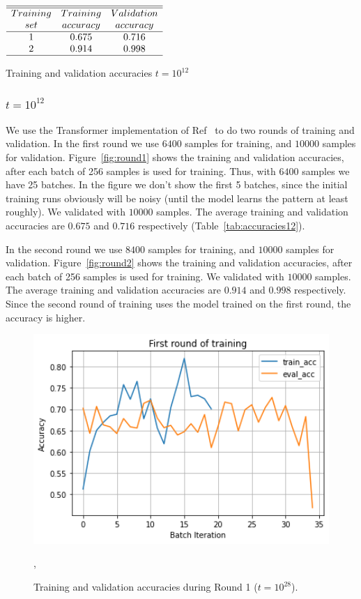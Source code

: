 \documentclass[twoside]{article}
\begin{document}
\begin{table}
\centering \(\begin{array}{ccc}
\hline
\hline
Training  & Training &Validation  \\
set     &accuracy&accuracy\\
\hline
1  & 0.675 & 0.716 \\

2  & 0.914 & 0.998 \\
\hline
\end{array}\)
\caption{Training and validation accuracies $t=10^{12}$}
\label{tab:accuracies12}
\end{table}

\subsubsection{\label{10E12} $t=10^{12}$}
We use the Transformer implementation of Ref~\cite{shankergit} to do two rounds of training and validation. In the first round we use $6400$ samples for training, and $10000$ samples for validation. Figure~\ref{fig:round1} shows the training and validation accuracies, after each batch of 256 samples is used for training. Thus, with $6400$ samples we have 25 batches. In the figure we don't show the first 5 batches, since the initial training runs obviously will be noisy (until the model learns the pattern at least roughly). We validated with $10000$ samples. The average training and validation accuracies are $0.675$ and $0.716$ respectively (Table~\ref{tab:accuracies12}).

In the second round we use $8400$ samples for training, and $10000$ samples for validation. Figure~\ref{fig:round2} shows the training and validation accuracies, after each batch of 256 samples is used for training.  We validated with $10000$ samples. The average training and validation accuracies are $0.914$ and $0.998$ respectively. Since the second round of training uses the model trained on the first round, the accuracy is higher.



\begin{figure}
\includegraphics[width=1.0\textwidth]{Round1_28.png}
\caption[]{ 
 Training and validation accuracies during Round 1 ($t=10^{28}$).
 }
\vspace{1mm}, 
\label{fig:round1_28}
\end{figure}
\end{document}
